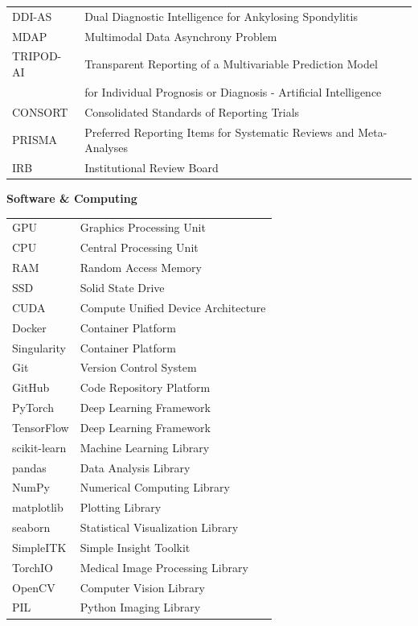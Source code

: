 \documentclass[12pt, a4paper]{article}
\begin{document}
\begin{tabular}{ll}
DDI-AS & Dual Diagnostic Intelligence for Ankylosing Spondylitis \\
MDAP & Multimodal Data Asynchrony Problem \\
TRIPOD-AI & Transparent Reporting of a Multivariable Prediction Model \\
& for Individual Prognosis or Diagnosis - Artificial Intelligence \\
CONSORT & Consolidated Standards of Reporting Trials \\
PRISMA & Preferred Reporting Items for Systematic Reviews and Meta-Analyses \\
IRB & Institutional Review Board \\
\end{tabular}

\vspace{0.5cm}
\textbf{Software \& Computing}

\begin{tabular}{ll}
GPU & Graphics Processing Unit \\
CPU & Central Processing Unit \\
RAM & Random Access Memory \\
SSD & Solid State Drive \\
CUDA & Compute Unified Device Architecture \\
Docker & Container Platform \\
Singularity & Container Platform \\
Git & Version Control System \\
GitHub & Code Repository Platform \\
PyTorch & Deep Learning Framework \\
TensorFlow & Deep Learning Framework \\
scikit-learn & Machine Learning Library \\
pandas & Data Analysis Library \\
NumPy & Numerical Computing Library \\
matplotlib & Plotting Library \\
seaborn & Statistical Visualization Library \\
SimpleITK & Simple Insight Toolkit \\
TorchIO & Medical Image Processing Library \\
OpenCV & Computer Vision Library \\
PIL & Python Imaging Library \\
\end{tabular}
\end{document}
